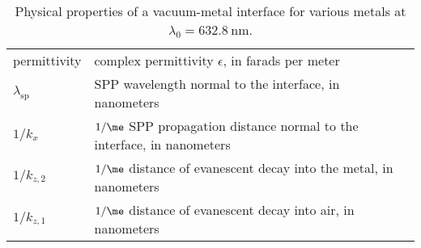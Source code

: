 \begin{table}
\begin{tabularx}{\textwidth}{ll}
permittivity & complex permittivity $\epsilon$, in farads per meter \\
$\lambda_\text{sp}$ & SPP wavelength normal to the interface, in nanometers\\
$1/k_x$ & $1/\me$ SPP propagation distance normal to the interface, in nanometers \\
$1/k_{z,2}$ & $1/\me$ distance of evanescent decay into the metal, in nanometers \\
$1/k_{z,1}$ & $1/\me$ distance of evanescent decay into air, in nanometers \\
\bottomrule
\end{tabularx}
\caption{Physical properties of a vacuum-metal interface for various metals at
$\lambda_0=\SI{632.8}{\nano\meter}$. }%
\label{tbl:sptable_632}
\end{table}
